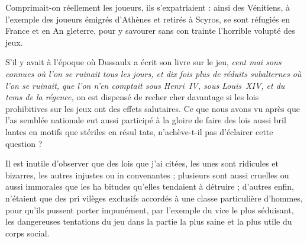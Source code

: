 Comprimait-on réellement les
joueurs, ils s'expatriaient : ainsi des
Vénitiens, à l'exemple des joueurs
émigrés d'Athènes et retirés à Scyros,
se sont réfugiés en France et en An%
gleterre, pour y savourer sans con%
trainte l'horrible volupté des jeux.

S'il y avait à l'époque où Dussaulx
a écrit son livre sur le jeu, \emph{cent mai%
  sons connues où l'on se ruinait tous
  les jours, et dix fois plus de réduits
  subalternes où l'on se ruinait, que
  l'on n'en comptait sous Henri~IV,
  sous Louis~XIV, et du tems de la
régence,} on est dispensé de recher%
cher davantage si les lois prohibitives
sur les jeux ont des effets salutaires.
Ce que nous avons vu après que l'as%
semblée nationale eut aussi participé
à la gloire de faire des lois aussi bril%
lantes en motifs que stériles en résul%
tats, n'achève-t-il pas d'éclairer cette
question ?

Il est inutile d'observer que des lois
que j'ai citées, les unes sont ridicules
et bizarres, les autres injustes ou in%
convenantes ; plusieurs sont aussi
cruelles ou aussi immorales que les ha%
bitudes qu'elles tendaient à détruire ;
d'autres enfin, n'étaient que des pri%
vilèges exclusifs accordés à une classe
particulière d'hommes, pour qu'ils
pussent porter impunément, par
l'exemple du vice le plus séduisant, les
dangereuses tentations du jeu dans la
partie la plus saine et la plus utile du
corps social.
